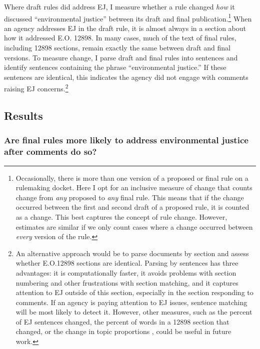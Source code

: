 \documentclass[
      12pt,
        ]{article}
\begin{document}
Where draft rules did address EJ, I measure whether a rule changed \emph{how} it discussed ``environmental justice'' between its draft and final publication.\footnote{Occasionally, there is more than one version of a proposed or final rule on a rulemaking docket. Here I opt for an inclusive measure of change that counts change from \emph{any} proposed to \emph{any} final rule. This means that if the change occurred between the first and second draft of a proposed rule, it is counted as a change. This best captures the concept of rule change. However, estimates are similar if we only count cases where a change occurred between \emph{every} version of the rule.}
When an agency addresses EJ in the draft rule, it is almost always in a section about how it addressed E.O. 12898. In many cases, much of the text of final rules, including 12898 sections, remain exactly the same between draft and final versions.
To measure change, I parse draft and final rules into sentences and identify sentences containing the phrase ``environmental justice.'' If these sentences are identical, this indicates the agency did not engage with comments raising EJ concerns.\footnote{An alternative approach would be to parse documents by section and assess whether E.O.12898 sections are identical. Parsing by sentences has three advantages: it is computationally faster, it avoids problems with section numbering and other frustrations with section matching, and it captures attention to EJ outside of this section, especially in the section responding to comments. If an agency is paying attention to EJ issues, sentence matching will be most likely to detect it. However, other measures, such as the percent of EJ sentences changed, the percent of words in a 12898 section that changed, or the change in topic proportions \citep{Judge-Lord2017}, could be useful in future work.}

\hypertarget{results}{%
\subsection{Results}\label{results}}

\hypertarget{are-final-rules-more-likely-to-address-environmental-justice-after-comments-do-so}{%
\subsubsection{Are final rules more likely to address environmental justice after comments do so?}\label{are-final-rules-more-likely-to-address-environmental-justice-after-comments-do-so}}
\end{document}
